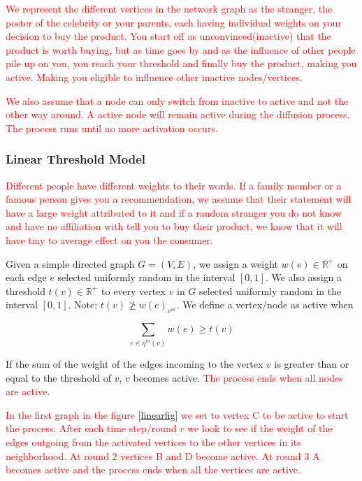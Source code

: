 \textcolor{red}{
We represent the different vertices in the network graph as the stranger, the poster of the celebrity or your parents, each having individual weights on your decision to buy the product. You start off as unconvinced(inactive) that the product is worth buying, but as time goes by and as the influence of other people pile up on you, you reach your threshold and finally buy the product, making you active. Making you eligible to influence other inactive nodes/vertices.}

\textcolor{red}{
We also assume that a node can only switch from inactive to active and not the other way around. A active node will remain active during the diffusion process. The process runs until no more activation occurs.\cite{Shakarian:2012:LSN:2456719.2457081} }
\subsubsection{Linear Threshold Model}
\textcolor{red}{Different people have different weights to their words. If a family member or a famous person gives you a recommendation, we assume that their statement will have a large weight attributed to it and if a random stranger you do not know and have no affiliation with tell you to buy their product, we know that it will have tiny to average effect on you the consumer.}

Given a simple directed graph $G=(V,E)$, we assign a weight $w(e) \in \mathbb{R}^{+}$ on each edge $e$ selected uniformly random in the interval $[0,1]$. We also assign a threshold $t(v) \in \mathbb{R}^{+}$ to every vertex $v$ in $G$ selected uniformly random in the interval $[0,1]$. Note: $t(v) \not\geq w(e)_{\nu^{in}}$.
We define a vertex/node as active when

		$$\sum_{e \in \eta^{in}(v)} w(e)\geq t(v)$$

If the sum of the weight of the edges incoming to the vertex $v$ is greater than or equal to the threshold of $v$, $v$ becomes active. \textcolor{red}{The process ends when all nodes are active.}

\textcolor{red}{
In the first graph in the figure \ref{linearfig} we set to vertex C to be active to start the process. After each time step/round $r$ we look to see if the weight of the edges outgoing from the activated vertices to the other vertices in its neighborhood. At round 2 vertices B and D become active. At round 3 A becomes active and the process ends when all the vertices are active. 
\cite{Kempe} 
}

